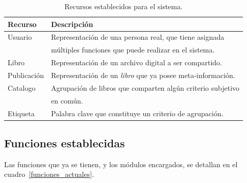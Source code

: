 \documentclass[letter,12pt]{article}
\begin{document}
\begin{table}
\begin{tabular}{l|l}
Recurso     & Descripción                                                 \\
\hline
Usuario     & Representación de una persona real, que tiene asignada        \\
            & múltiples funciones que puede realizar en el sistema.          \\
Libro       & Representación de un archivo digital a ser compartido.          \\
Publicación & Representación de un \emph{libro} que ya posee meta-información. \\
Catalogo    & Agrupación de libros que comparten algún criterio subjetivo       \\
            & en común.                                                          \\
Etiqueta    & Palabra clave que constituye un criterio de agrupación.             \\
\end{tabular}
\caption{Recursos establecidos para el sistema.}
\label{recursos_actuales}
\end{table}

\subsection{Funciones establecidas}
Las funciones que ya se tienen, y los módulos encargados, se detallan en el 
cuadro~\ref{funciones_actuales}.
\end{document}
